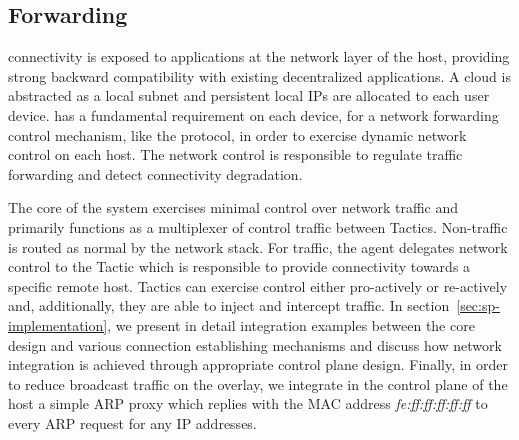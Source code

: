 

\subsection{Forwarding} \label{signpost-forwarding}

\signpost connectivity is exposed to applications  at the network layer of the
host, providing strong backward compatibility with existing decentralized
applications. A \signpost cloud is abstracted as a local subnet and persistent
local IPs are allocated to each user device. \signpost has a fundamental requirement on
each device, for a network forwarding control mechanism, like the \of protocol,
in order to exercise dynamic network control on each host. The \signpost network
control is responsible to regulate traffic forwarding and detect connectivity
degradation.

The core of the \signpost system exercises minimal control over network traffic
and primarily functions as a multiplexer of control traffic between Tactics.
Non-\signpost traffic is routed as normal by the network stack.  For \signpost
traffic, the \signpost agent delegates network control to the Tactic which is 
responsible to provide connectivity towards a specific remote \signpost host.
Tactics can exercise control either pro-actively or re-actively and,
additionally, they are able to inject and intercept traffic. In
section~\ref{sec:sp-implementation}, we present in detail integration examples
between the \signpost core design and various connection establishing mechanisms
and discuss how network integration is achieved through appropriate control
plane design.  Finally, in order to reduce broadcast traffic on the
\signpost overlay, we integrate in the control plane of the host a simple
ARP proxy which replies with the MAC address {\it fe:ff:ff:ff:ff:ff}\/ to every
ARP request for any \signpost IP addresses. 

